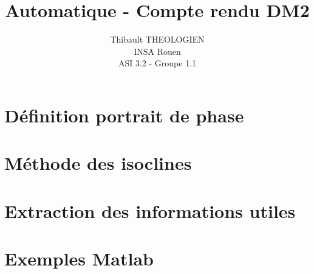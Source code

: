 \documentclass[a4paper,12pt]{article}
\title{Automatique - Compte rendu DM2}
\author{Thibault THEOLOGIEN\\
        INSA Rouen\\
        ASI 3.2 - Groupe 1.1}
\begin{document}
	\maketitle
	\tableofcontents
	\newpage

  \section{Définition portrait de phase}
  \label{sec:Définition portrait de phase}
    \newpage

  \section{Méthode des isoclines}
  \label{sec:Méthode des isoclines}
    \newpage

  \section{Extraction des informations utiles}
  \label{sec:Extraction des informations utiles}
    \newpage

  \section{Exemples Matlab}
  \label{sec:Exemples Matlab}
\end{document}
